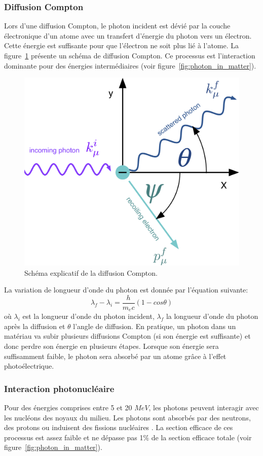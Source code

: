 \subsubsection{Diffusion Compton}
Lors d'une diffusion Compton, le photon incident est dévié par la couche électronique d'un atome avec un transfert d'énergie du photon vers un électron. Cette énergie est suffisante pour que l'électron ne soit plus lié à l'atome. La figure~\ref{fig:compton_scattering} présente un schéma de diffusion Compton. Ce processus est l'interaction dominante pour des énergies intermédiaires (voir figure~\ref{fig:photon_in_matter}).
\begin{figure}[!h]
  \begin{center}
    \includegraphics[width=.4\textwidth]{ShowerTh/figs/compton_scattering.png}
    \caption{Schéma explicatif de la diffusion Compton.}
    \label{fig:compton_scattering}
  \end{center}
\end{figure}
La variation de longueur d'onde du photon est donnée par l'équation suivante:
\begin{equation}
  \label{eq.compton}
  \lambda_f-\lambda_i=\frac{h}{m_ec}(1-cos\theta)
\end{equation}
où $\lambda_i$ est la longueur d'onde du photon incident, $\lambda_f$ la longueur d'onde du photon après la diffusion et $\theta$ l'angle de diffusion. En pratique, un photon dans un matériau va subir plusieurs diffusions Compton (si son énergie est suffisante) et donc perdre son énergie en plusieurs étapes. Lorsque son énergie sera suffisamment faible, le photon sera absorbé par un atome grâce à l'effet photoélectrique. 

\subsubsection{Interaction photonucléaire}
Pour des énergies comprises entre 5 et 20 $MeV$, les photons peuvent interagir avec les nucléons des noyaux du milieu. Les photons sont absorbés par des neutrons, des protons ou induisent des fissions nucléaires \cite{wigmans}. La section efficace de ces processus est assez faible et ne dépasse pas 1$\%$ de la section efficace totale (voir figure~\ref{fig:photon_in_matter}).

